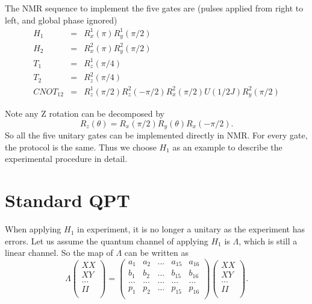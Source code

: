\documentclass[12pt,nofootinbib,notitlepage,onecolumn,superscriptaddress]{revtex4-1}
\theoremstyle{plain}
\theoremstyle{definition}
\newcommand{\be}{\begin{equation}}
\newcommand{\ee}{\end{equation}}
\newcommand{\bea}{\begin{eqnarray}}
\newcommand{\eea}{\end{eqnarray}}
\begin{document}
The NMR sequence to implement the five gates are (pulses applied from right to left, and global phase ignored)
\bea
H_1 &=& R_x^1(\pi)R_y^1(\pi/2) \\
H_2 &=& R_x^2(\pi)R_y^2(\pi/2) \\
T_1 &=& R_z^1(\pi/4) \\
T_2 &=& R_z^2(\pi/4) \\
CNOT_{12} &=& R_z^1(\pi/2)R_z^2(-\pi/2)R_x^2(\pi/2)U(1/2J)R_y^2(\pi/2)
\eea

Note any Z rotation can be decomposed by 
\be
R_z(\theta) = R_x(\pi/2)R_y(\theta)R_x(-\pi/2).
\ee
So all the five unitary gates can be implemented directly in NMR. For every gate, the protocol is the same. Thus we choose $H_1$ as an example to describe the experimental procedure in detail.

\section{Standard QPT}

When applying $H_1$ in experiment, it is no longer a unitary as the experiment has errors. Let us assume the quantum channel of applying $H_1$ is $\Lambda$, which is still a linear channel. So the map of $\Lambda$ can be written as 
\be
\Lambda \left(
          \begin{array}{c}
            XX \\
            XY \\
            ... \\
            II \\
          \end{array}
        \right) = \left(
                    \begin{array}{ccccc}
                      a_1 & a_2 & ... & a_{15} & a_{16} \\
                      b_1 & b_2 & ... & b_{15} & b_{16} \\
                      ... & ... & ... & ... & ... \\
                      p_1 & p_2 & ... & p_{15} & p_{16} \\
                    \end{array}
                  \right) \left(
          \begin{array}{c}
            XX \\
            XY \\
            ... \\
            II \\
          \end{array}
        \right).
\ee
\end{document}
